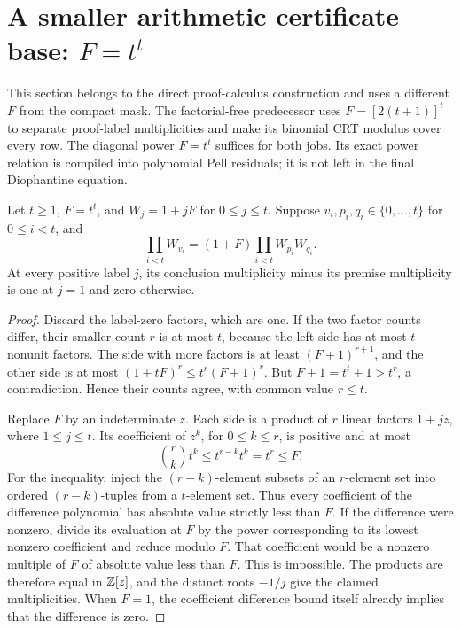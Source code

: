 \section{A smaller arithmetic certificate base: \texorpdfstring{$F=t^t$}{the diagonal power}}\label{sec:selfpower}

This section belongs to the direct proof-calculus construction and uses a
different $F$ from the compact mask. The factorial-free predecessor uses
$F=[2(t+1)]^t$ to separate proof-label multiplicities and make its binomial
CRT modulus cover every row. The diagonal power $F=t^t$ suffices for both
jobs. Its exact power relation is compiled into polynomial Pell residuals;
it is not left in the final Diophantine equation.

\begin{lemma}\label{lem:labels}
Let $t\ge1$, $F=t^t$, and $W_j=1+jF$ for $0\le j\le t$.
Suppose $v_i,p_i,q_i\in\{0,\ldots,t\}$ for $0\le i<t$, and
\begin{equation}\label{eq:labels}
 \prod_{i<t}W_{v_i}=(1+F)\prod_{i<t}W_{p_i}W_{q_i}.
\end{equation}
At every positive label $j$, its conclusion multiplicity minus its
premise multiplicity is one at $j=1$ and zero otherwise.
\end{lemma}
\begin{proof}
Discard the label-zero factors, which are one. If the two factor counts
differ, their smaller count $r$ is at most $t$, because the left side
has at most $t$ nonunit factors. The side with more factors is at least
$(F+1)^{r+1}$, and the other side is at most
$(1+tF)^r\le t^r(F+1)^r$. But $F+1=t^t+1>t^r$, a contradiction.
Hence their counts agree, with common value $r\le t$.

Replace $F$ by an indeterminate $z$. Each side is a product of $r$
linear factors $1+jz$, where $1\le j\le t$. Its coefficient of $z^k$,
for $0\le k\le r$, is positive and at most
\[
 \binom rk t^k\le t^{r-k}t^k=t^r\le F.
\]
For the inequality, inject the $(r-k)$-element subsets of an $r$-element
set into ordered $(r-k)$-tuples from a $t$-element set. Thus every
coefficient of the difference polynomial has absolute value strictly
less than $F$. If the difference were nonzero, divide its evaluation
at $F$ by the power corresponding to its lowest nonzero coefficient
and reduce modulo $F$. That coefficient would be a nonzero multiple
of $F$ of absolute value less than $F$. This is impossible.
The products are therefore equal in $\mathbb Z[z]$, and the distinct roots
$-1/j$ give the claimed multiplicities. When $F=1$, the coefficient
difference bound itself already implies that the difference is zero.
\end{proof}

